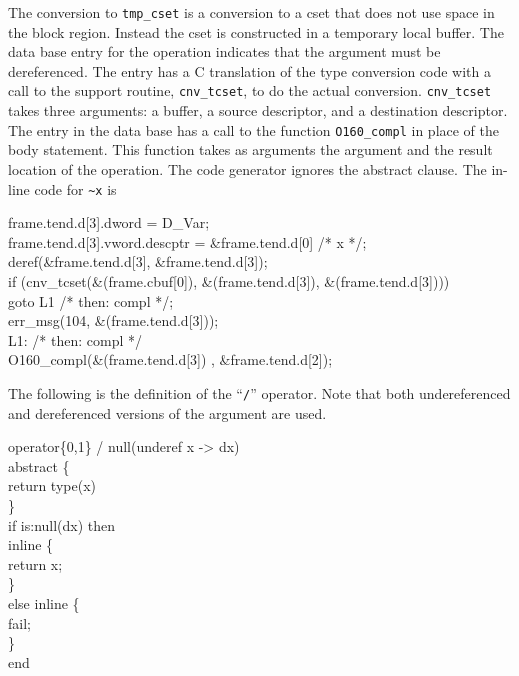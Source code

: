\noindent
The conversion to \texttt{tmp\_cset} is a conversion to a cset that
does not use space in the block region. Instead the cset is
constructed in a temporary local buffer. The data base entry for the
operation indicates that the argument must be dereferenced. The entry
has a C translation of the type conversion code with a call to the
support routine, \texttt{cnv\_tcset}, to do the actual
conversion. \texttt{cnv\_tcset} takes three arguments: a buffer, a
source descriptor, and a destination descriptor. The entry in the data
base has a call to the function \texttt{O160\_compl} in place of the
body statement. This function takes as arguments the argument and the
result location of the operation. The code generator ignores the
abstract clause. The in-line code for \texttt{\textasciitilde{}x} is

\goodbreak
\begin{iconcode}
\>\>frame.tend.d[3].dword = D\_Var;\\
\>\>frame.tend.d[3].vword.descptr = \&frame.tend.d[0] /* x */;\\
\>\>deref(\&frame.tend.d[3], \&frame.tend.d[3]);\\
\>\>if (cnv\_tcset(\&(frame.cbuf[0]), \&(frame.tend.d[3]), \&(frame.tend.d[3])))\\
\>\>\>goto L1 /* then: compl */;\\
\>\>err\_msg(104, \&(frame.tend.d[3]));\\
\>L1: /* then: compl */\\
\>\>O160\_compl(\&(frame.tend.d[3]) , \&frame.tend.d[2]);\\
\end{iconcode}


The following is the definition of the ``\texttt{/}'' operator. Note
that both undereferenced and dereferenced versions of the argument are
used.

\goodbreak
\begin{iconcode}
operator\{0,1\} / null(underef x -> dx)\\
\>abstract \{\\
\>\>return type(x)\\
\>\>\}\\
\>if is:null(dx) then\\
\>\>inline \{\\
\>\>\>return x;\\
\>\>\>\}\\
\>else inline \{\\
\>\>fail;\\
\>\>\}\\
end\\
\end{iconcode}

